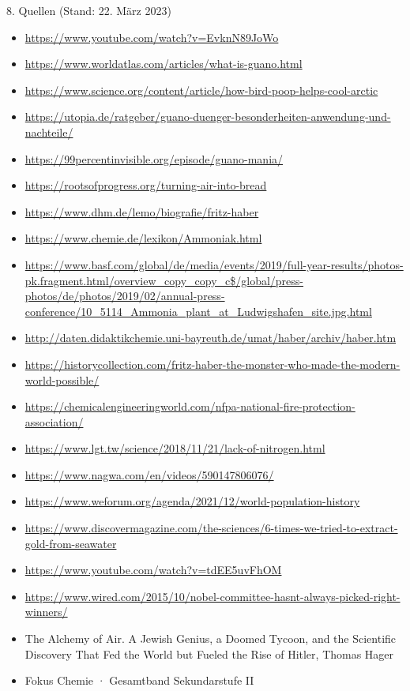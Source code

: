 \documentclass[
    aspectratio=1610
    ]{beamer}
\begin{document}
    \begin{frame}{8. Quellen (Stand: 22. März 2023)}
        \tiny\begin{itemize}
            \item \url{https://www.youtube.com/watch?v=EvknN89JoWo}
            \item \url{https://www.worldatlas.com/articles/what-is-guano.html}
            \item \url{https://www.science.org/content/article/how-bird-poop-helps-cool-arctic}
            \item \url{https://utopia.de/ratgeber/guano-duenger-besonderheiten-anwendung-und-nachteile/} 
            \item \url{https://99percentinvisible.org/episode/guano-mania/}
            \item \url{https://rootsofprogress.org/turning-air-into-bread}
            \item \url{https://www.dhm.de/lemo/biografie/fritz-haber}
            \item \url{https://www.chemie.de/lexikon/Ammoniak.html}
            \item \url{https://www.basf.com/global/de/media/events/2019/full-year-results/photos-pk.fragment.html/overview_copy_copy_c$/global/press-photos/de/photos/2019/02/annual-press-conference/10_5114_Ammonia_plant_at_Ludwigshafen_site.jpg.html}
            \item \url{http://daten.didaktikchemie.uni-bayreuth.de/umat/haber/archiv/haber.htm}
            \item \url{https://historycollection.com/fritz-haber-the-monster-who-made-the-modern-world-possible/}
            \item \url{https://chemicalengineeringworld.com/nfpa-national-fire-protection-association/}
            \item \url{https://www.lgt.tw/science/2018/11/21/lack-of-nitrogen.html}
            \item \url{https://www.nagwa.com/en/videos/590147806076/}
            \item \url{https://www.weforum.org/agenda/2021/12/world-population-history}
            \item \url{https://www.discovermagazine.com/the-sciences/6-times-we-tried-to-extract-gold-from-seawater}
            \item \url{https://www.youtube.com/watch?v=tdEE5uvFhOM}
            \item \url{https://www.wired.com/2015/10/nobel-committee-hasnt-always-picked-right-winners/}
            \item The Alchemy of Air. A Jewish Genius, a Doomed Tycoon, and the Scientific Discovery That Fed the World but Fueled the Rise of Hitler, Thomas Hager
            \item Fokus Chemie · Gesamtband Sekundarstufe II
        \end{itemize}           
    \end{frame}
\end{document}
